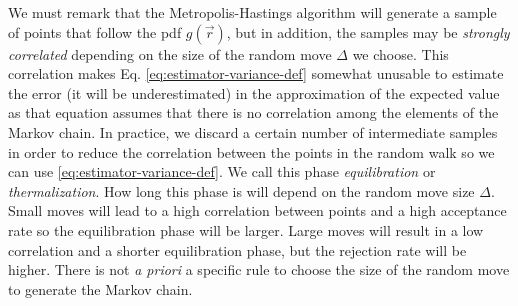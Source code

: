 We must remark that the Metropolis-Hastings algorithm will generate a sample of
points that follow the pdf $g(\vec r)$, but in addition, the samples may be
\textit{strongly correlated} depending on the size of the random move $\Delta$
we choose. This correlation makes Eq. \eqref{eq:estimator-variance-def} somewhat
unusable to estimate the error (it will be underestimated) in the approximation
of the expected value as that equation assumes that there is no correlation
among the elements of the Markov chain. In practice, we discard a certain number
of intermediate samples in order to reduce the correlation between the points in
the random walk so we can use \eqref{eq:estimator-variance-def}. We call this
phase \textit{equilibration} or \textit{thermalization}. How long this phase is
will depend on the random move size $\Delta$. Small moves will lead to a high
correlation between points and a high acceptance rate so the equilibration phase
will be larger. Large moves will result in a low correlation and a shorter
equilibration phase, but the rejection rate will be higher. There is not
\textit{a priori} a specific rule to choose the size of the random move to
generate the Markov chain.


